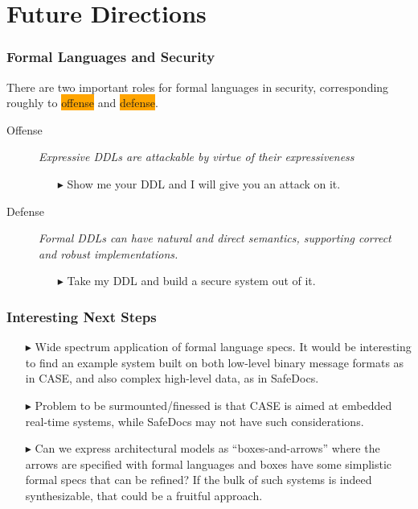 \documentclass{beamer}
\newcommand{\kemph}[1]{\colorbox{orange}{#1}}
\begin{document}
\section{Future Directions}

\begin{frame} \frametitle{Formal Languages and Security}

There are two important roles for formal languages in security,
corresponding roughly to \kemph{offense} and \kemph{defense}.

\begin{description}
\item [Offense] \textit{Expressive DDLs are attackable by virtue of
  their expressiveness}
  \begin{itemize}
    \item [$\blacktriangleright$] Show me your DDL and I will give you an attack on it.
  \end{itemize}
\item [Defense] \textit{Formal DDLs can have natural and direct
  semantics, supporting correct and robust implementations.}
  \begin{itemize}
  \item [$\blacktriangleright$] Take my DDL and build a secure system out of it.
  \end{itemize}
  \end{description}
\end{frame}

\begin{frame} \frametitle{Interesting Next Steps}

\begin{itemize}
\item [$\blacktriangleright$] Wide spectrum application of formal language specs. It
  would be interesting to find an example system built on both
  low-level binary message formats as in CASE, and also complex
  high-level data, as in SafeDocs.

\item [$\blacktriangleright$] Problem to be surmounted/finessed is
  that CASE is aimed at embedded real-time systems, while SafeDocs may
  not have such considerations.

\item [$\blacktriangleright$] Can we express architectural models as
  ``boxes-and-arrows'' where the arrows are specified with formal
  languages and boxes have some simplistic formal specs that can be
  refined? If the bulk of such systems is indeed synthesizable, that
  could be a fruitful approach.

\end{itemize}

\end{frame}
\end{document}

